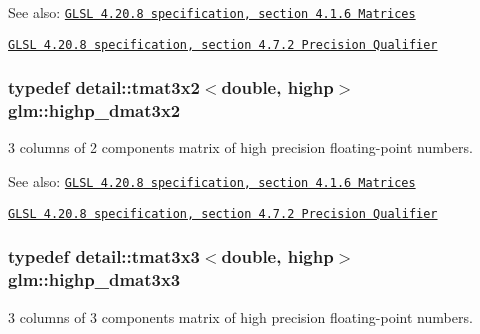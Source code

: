 \begin{Desc}
\item[See also:]\href{http://www.opengl.org/registry/doc/GLSLangSpec.4.20.8.pdf}{\tt GLSL 4.20.8 specification, section 4.1.6 Matrices} 

\href{http://www.opengl.org/registry/doc/GLSLangSpec.4.20.8.pdf}{\tt GLSL 4.20.8 specification, section 4.7.2 Precision Qualifier} \end{Desc}
\hypertarget{group__core__precision_gc956fe6b946f0ccee78367ccd5427351}{
\subsubsection[highp\_\-dmat3x2]{\setlength{\rightskip}{0pt plus 5cm}typedef detail::tmat3x2$<$double, highp$>$ {\bf glm::highp\_\-dmat3x2}}}
\label{group__core__precision_gc956fe6b946f0ccee78367ccd5427351}


3 columns of 2 components matrix of high precision floating-point numbers.

\begin{Desc}
\item[See also:]\href{http://www.opengl.org/registry/doc/GLSLangSpec.4.20.8.pdf}{\tt GLSL 4.20.8 specification, section 4.1.6 Matrices} 

\href{http://www.opengl.org/registry/doc/GLSLangSpec.4.20.8.pdf}{\tt GLSL 4.20.8 specification, section 4.7.2 Precision Qualifier} \end{Desc}
\hypertarget{group__core__precision_gd7229dea82287910d88e6e8566e39fc7}{
\subsubsection[highp\_\-dmat3x3]{\setlength{\rightskip}{0pt plus 5cm}typedef detail::tmat3x3$<$double, highp$>$ {\bf glm::highp\_\-dmat3x3}}}
\label{group__core__precision_gd7229dea82287910d88e6e8566e39fc7}


3 columns of 3 components matrix of high precision floating-point numbers.


